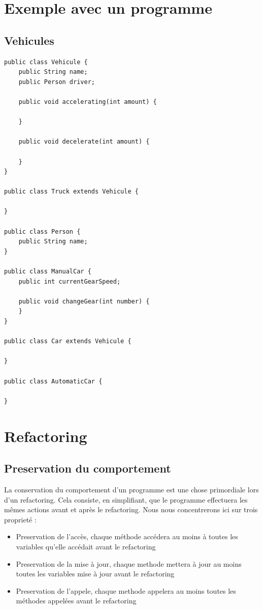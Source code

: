 \documentclass[a4paper, 10pt]{article}
\begin{document}
\newpage
\section{Exemple avec un programme}

\subsection{Vehicules}

\begin{lstlisting}[frame=single]
public class Vehicule {
	public String name;
	public Person driver;

	public void accelerating(int amount) {

	}

	public void decelerate(int amount) {
	
	}
}

public class Truck extends Vehicule {

}

public class Person {
	public String name;
}

public class ManualCar {
	public int currentGearSpeed;
	
	public void changeGear(int number) {
	}
}

public class Car extends Vehicule {

}

public class AutomaticCar {

}
\end{lstlisting}

\newpage
\section{Refactoring}

\subsection{Preservation du comportement}
La conservation du comportement d'un programme est une chose primordiale lors d'un refactoring. Cela consiste, en simplifiant, que le programme effectuera les mêmes actions avant et après le refactoring. Nous nous concentrerons ici sur trois proprieté :

\begin{itemize}
\item Preservation de l'accès, chaque méthode accédera au moins à toutes les variables qu'elle accédait avant le refactoring
\item Preservation de la mise à jour, chaque methode mettera à jour au moins toutes les variables mise à jour avant le refactoring
\item Preservation de l'appele, chaque methode appelera au moins toutes les méthodes appelées avant le refactoring
\end{itemize}
\end{document}
